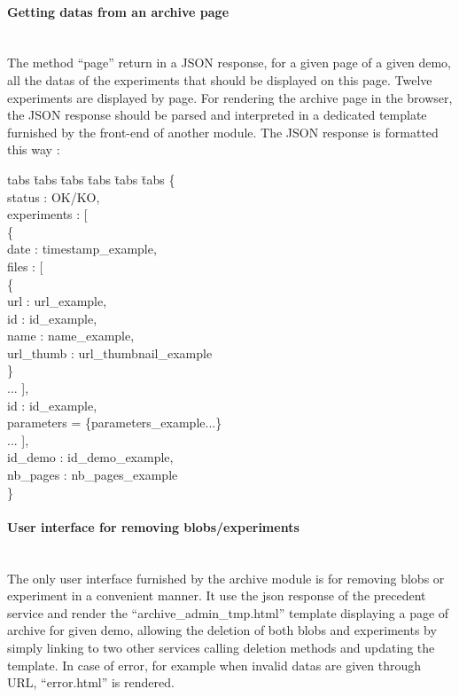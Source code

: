 \paragraph{Getting datas from an archive page} \hspace{0pt} \\
The method ``page'' return in a JSON response, for a given page of a given demo, all the datas of the experiments that should be displayed on this page. Twelve experiments are displayed by page. For rendering the archive page in the browser, the JSON response should be parsed and interpreted in a dedicated template furnished by the front-end of another module. The JSON response is formatted this way : 
\begin{tabbing}
tabs \= tabs \= tabs \= tabs \= tabs \= tabs \kill
\{ \\
\> status :  OK/KO, \\
\> experiments : [ \\
\> \> \{ \\
\> \> \> date : timestamp\_example, \\ 
\> \> \> files : [ \\
\> \> \> \>  \{ \\
\> \> \> \> \> url : url\_example, \\
\> \> \> \> \> id : id\_example, \\
\> \> \> \> \> name : name\_example, \\
\> \> \> \> \> url\_thumb : url\_thumbnail\_example \\
\> \> \> \> \} \\
\> \> \> ... ], \\
\> \> \> id : id\_example, \\
\> \> \> parameters = \{parameters\_example...\} \\
\> ... ], \\
\> id\_demo : id\_demo\_example, \\
\> nb\_pages : nb\_pages\_example \\
\} \\
\end{tabbing} 

\paragraph{User interface for removing blobs/experiments} \hspace{0pt} \\
The only user interface furnished by the archive module is for removing blobs or experiment in a convenient manner. It use the json response of the precedent service and render the ``archive\_admin\_tmp.html'' template displaying a page of archive for given demo, allowing the deletion of both blobs and experiments by simply linking to two other services calling deletion methods and updating the template. In case of error, for example when invalid datas are given through URL, ``error.html'' is rendered.

